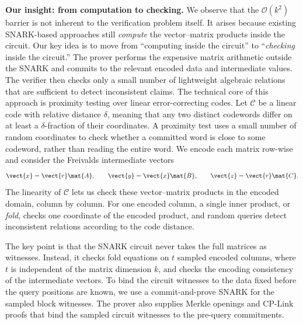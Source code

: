 \noindent\textbf{Our insight: from computation to checking.}
We observe that the \(\mathcal{O}(k^2)\) barrier is not inherent to the
verification problem itself.  It arises because existing SNARK-based approaches
still \emph{compute} the vector--matrix products inside the circuit.  Our key
idea is to move from ``computing inside the circuit'' to ``\emph{checking} inside the
circuit.''  The prover performs the expensive matrix arithmetic outside the
SNARK and commits to the relevant encoded data and intermediate values.  The
verifier then checks only a small number of lightweight algebraic relations
that are sufficient to detect inconsistent claims.
The technical core of this approach is proximity testing over linear
error-correcting codes.  Let \(\mathcal{C}\) be a linear code with relative
distance \(\delta\), meaning that any two distinct codewords differ on at
least a \(\delta\)-fraction of their coordinates.  A proximity test uses a
small number of random coordinates to check whether a committed word is close
to some codeword, rather than reading the entire word.  We encode each matrix
row-wise and consider the Freivalds
intermediate vectors
\[
  \vect{x}=\vect{r}\mat{A},\qquad
  \vect{y}=\vect{x}\mat{B},\qquad
  \vect{z}=\vect{r}\mat{C}.
\]
The linearity of \(\mathcal{C}\) lets us check these vector--matrix products in
the encoded domain, column by column.  For one encoded column, a single inner
product, or \emph{fold}, checks one coordinate of the encoded product, and
random queries detect inconsistent relations according to the code distance.

The key point is that the SNARK circuit never takes the full matrices as
witnesses.  Instead, it checks fold equations on \(t\) sampled encoded columns,
where \(t\) is independent of the matrix dimension \(k\), and checks the
encoding consistency of the intermediate vectors.
To bind the circuit witnesses to the data fixed before the query positions are known,
we use a commit-and-prove SNARK for the sampled block witnesses.  The prover
also supplies Merkle openings and CP-Link proofs that bind the sampled circuit
witnesses to the pre-query commitments.


